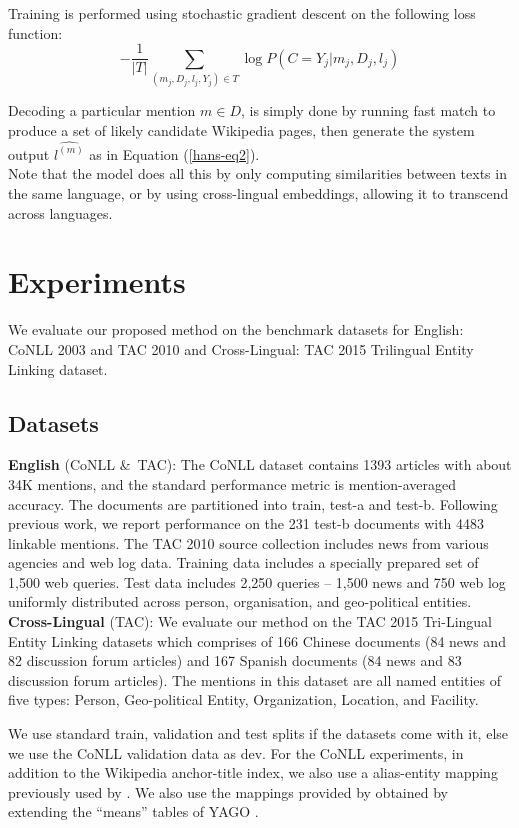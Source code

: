 \documentclass[letterpaper]{article} \usepackage{aaai18}  \usepackage{times}  \usepackage{helvet}  \usepackage{courier}  \usepackage{url}  \usepackage{graphicx}  \frenchspacing  \setlength{\pdfpagewidth}{8.5in}  \setlength{\pdfpageheight}{11in}  \usepackage{latexsym}
\begin{document}
Training is performed using stochastic gradient descent on the following loss function:
\begin{equation}
-\frac{1}{|T|}\sum_{(m_j,D_j,l_j,Y_j)\in T}\log P(C=Y_j|m_j,D_j,l_j)
\end{equation}

Decoding a particular mention $m\in D$, is simply done by running fast match  to produce a set of likely candidate Wikipedia pages, then generate the system output $\hat{l^{(m)}}$ as in Equation (\ref{hans-eq2}).\\
Note that the model does all this by only computing similarities between texts in the same language, or by using cross-lingual embeddings, allowing it to transcend across languages. \section{Experiments}
\label{sec:experiments}
We evaluate our proposed method on the benchmark datasets for English: CoNLL 2003 and TAC 2010 and Cross-Lingual: TAC 2015 Trilingual Entity Linking dataset.





\subsection{Datasets}
\textbf{English} (CoNLL \&\ TAC): The CoNLL dataset \cite{2011-emnlp-NE-disambig-yago} contains 1393 articles with about 34K mentions,
and the standard performance metric is
mention-averaged accuracy. The documents are
partitioned into train, test-a and test-b. Following previous work, we report performance on the 231 test-b
documents with 4483 linkable mentions. The TAC 2010 source collection includes news
from various agencies and web log data. Training
data includes a specially prepared set of 1,500
web queries. Test data includes 2,250 queries –
1,500 news and 750 web log uniformly distributed
across person, organisation, and geo-political entities. \\
\textbf{Cross-Lingual}   (TAC): We evaluate our method on the TAC 2015 Tri-Lingual Entity Linking datasets which comprises of 166 Chinese documents (84 news and 82 discussion forum articles) and 167 Spanish documents (84 news
and 83 discussion forum articles). The mentions in
this dataset are all named entities of five types: Person,
Geo-political Entity, Organization, Location,
and Facility.

We use standard train, validation and test splits if the datasets come with it, else we use the CoNLL validation data as dev. For the CoNLL experiments, in addition to the Wikipedia anchor-title index, we also use a alias-entity mapping previously used by \cite{pershina2015personalized,globerson2016collective,yamada2016joint}. We also use the mappings provided by \cite{2011-emnlp-NE-disambig-yago} obtained by extending the “means” tables
of YAGO \cite{hoffart2013yago2}.
\end{document}
